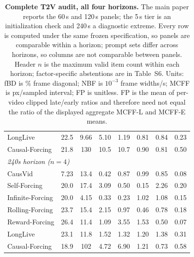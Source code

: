 \begin{table}[!tb]
\begin{tabular}{lccccccc}
LongLive & 22.5 & 9.66 & 5.10 & 1.19 & 0.81 & 0.84 & 0.23 \\
Causal-Forcing & 21.8 & 130 & 10.5 & 10.7 & 0.90 & 0.81 & 0.50 \\
\midrule
\multicolumn{8}{l}{\textit{240s horizon  ($n=4$)}} \\
CausVid & 7.23 & 13.4 & 0.42 & 0.87 & 0.99 & 0.85 & 0.08 \\
Self-Forcing & 20.0 & 17.4 & 3.09 & 0.50 & 0.15 & 2.26 & 0.20 \\
Infinite-Forcing & 20.0 & 4.15 & 0.33 & 0.23 & 1.02 & 1.08 & 0.15 \\
Rolling-Forcing & 23.7 & 15.4 & 2.15 & 0.97 & 0.46 & 0.78 & 0.18 \\
Reward-Forcing & 26.4 & 11.4 & 1.09 & 3.55 & 1.53 & 0.50 & 0.07 \\
LongLive & 23.1 & 11.8 & 1.52 & 1.32 & 1.20 & 1.38 & 0.31 \\
Causal-Forcing & 18.9 & 102 & 4.72 & 6.90 & 1.21 & 0.73 & 0.58 \\
\bottomrule
\end{tabular}
\caption{\textbf{Complete T2V audit, all four horizons.} The main paper reports the 60\,s and 120\,s panels; the 5\,s tier is an initialization check and 240\,s a diagnostic extreme. Every row is computed under the same frozen specification, so panels are comparable within a horizon; prompt sets differ across horizons, so columns are not comparable between panels. Header $n$ is the maximum valid item count within each horizon; factor-specific abstentions are in Table~S6. Units: fBD is \% frame diagonal; NBF is $10^{-3}$ frame widths/s; MCFF is px/sampled interval; FP is unitless. FP is the mean of per-video clipped late/early ratios and therefore need not equal the ratio of the displayed aggregate MCFF-L and MCFF-E means.}
\label{tab:t2v_audit_full}
\end{table}
